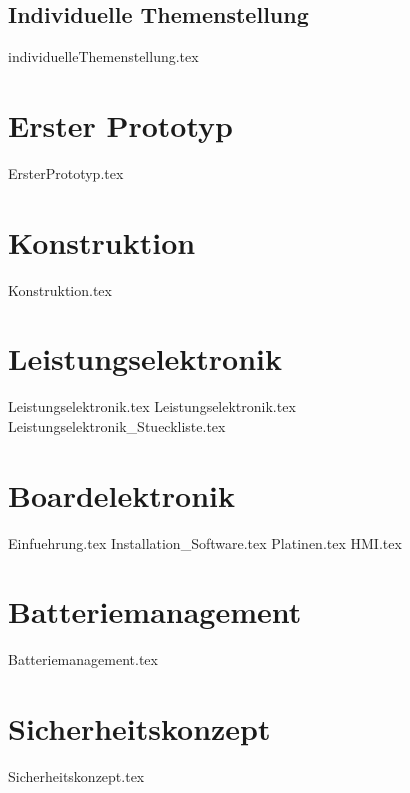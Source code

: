 \documentclass[paper=a4,12pt]{scrreprt}
\begin{document}
\section{Individuelle Themenstellung}
{individuelleThemenstellung.tex}

\chapter{Erster Prototyp}
{ErsterPrototyp.tex}

\chapter{Konstruktion}
{Konstruktion.tex}

\chapter{Leistungselektronik}
{Leistungselektronik.tex}
{Leistungselektronik.tex}
{Leistungselektronik_Stueckliste.tex}
\chapter{Boardelektronik}
{Einfuehrung.tex}
{Installation_Software.tex}
{Platinen.tex}
{HMI.tex}

\chapter{Batteriemanagement}
{Batteriemanagement.tex}

\chapter{Sicherheitskonzept}
{Sicherheitskonzept.tex}
\end{document}
